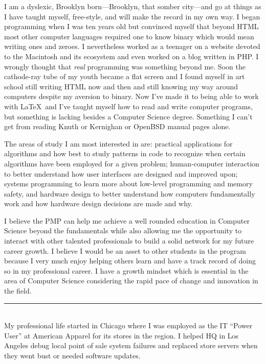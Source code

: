 \documentclass[12pt]{article}
\begin{document}
I am a dyslexic, Brooklyn born---Brooklyn, that somber city---and go at things as I have taught myself, free-style, and will make the record in my own way.
I began programming when I was ten years old but convinced myself that beyond HTML most other computer languages required one to know binary which would mean writing ones and zeroes. I nevertheless worked as a teenager on a website devoted to the Macintosh and its ecosystem and even worked on a blog written in PHP. I wrongly thought that \emph{real} programming was something beyond me. Soon the cathode-ray tube of my youth became a flat screen and I found myself in art school still writing HTML now and then and still knowing my way around computers despite my aversion to binary. Now I've made it to being able to work with \LaTeX\ and I've taught myself how to read and write computer programs, but something is lacking besides a Computer Science degree. Something I can't get from reading Knuth or Kernighan or OpenBSD manual pages alone.

The areas of study I am most interested in are: practical applications for algorithms and how best to study patterns in code to recognize when certain algorithms have been employed for a given problem; human-computer interaction to better understand how user interfaces are designed and improved upon; systems programming to learn more about low-level programming and memory safety, and hardware design to better understand how computers fundamentally work and how hardware design decisions are made and why.

I believe the PMP can help me achieve a well rounded education in Computer Science beyond the fundamentals while also allowing me the opportunity to interact with other talented professionals to build a solid network for my future career growth. I believe I would be an asset to other students in the program because I very much enjoy helping others learn and have a track record of doing so in my professional career. I have a growth mindset which is essential in the area of Computer Science considering the rapid pace of change and innovation in the field.\\

\hrule\
\\

My professional life started in Chicago where I was employed as the IT ``Power User'' at American Apparel for its stores in the region. I helped HQ in Los Angeles debug local point of sale system failures and replaced store servers when they went bust or needed software updates.
\end{document}
